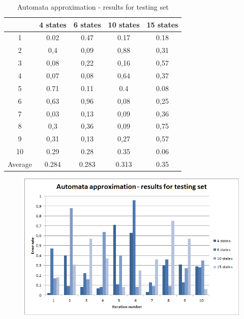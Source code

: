 \documentclass[runningheads,a4paper]{llncs}
\begin{document}
\begin{table}[]
\centering
\caption{Automata approximation - results for testing set}
\label{my-label}
\begin{tabular}{@{}ccccc@{}}
\toprule
        & 4 states & 6 states & 10 states & 15 states \\ \midrule
1       & 0.02     & 0.47     & 0.17      & 0.18      \\
2       & 0,4      & 0,09     & 0,88      & 0,31      \\
3       & 0,08     & 0,22     & 0,16      & 0,57      \\
4       & 0,07     & 0,08     & 0,64      & 0,37      \\
5       & 0.71     & 0.11     & 0.4       & 0.08      \\
6       & 0,63     & 0,96     & 0,08      & 0,25        \\
7       & 0,03     & 0,13     & 0,09      & 0,36        \\
8       & 0,3      & 0,36     & 0,09      & 0,75         \\
9       & 0,31     & 0,13     & 0,27      & 0,57     \\
10      & 0.29     & 0.28     & 0.35      & 0.06      \\
Average & 0.284    & 0.283    & 0.313     & 0.35      \\ \bottomrule
\end{tabular}
\end{table}

\begin{figure}
\centering
\includegraphics[scale=1]{1.png}
\end{figure}
\end{document}
